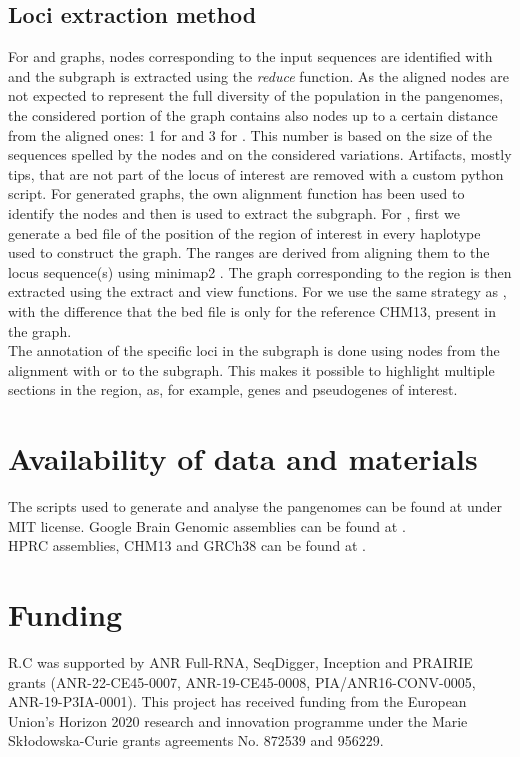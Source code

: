 \subsection*{\textbf{Loci extraction method}}
\label{app:extraction}
For \bifrost and \mdbg graphs, nodes corresponding to the input sequences are identified with \graphaligner\cite{graphaligner} and the subgraph is extracted using the \bandage \emph{reduce} function. As the aligned nodes are not expected to represent the full diversity of the population in the pangenomes, the considered portion of the graph contains also nodes up to a certain distance from the aligned ones: 1 for \mdbg and 3 for \bifrost. This number is based on the size of the sequences spelled by the nodes and on the considered variations. Artifacts, mostly tips, that are not part of the locus of interest are removed with a custom python script. For \minigraph generated graphs, the \minigraph own alignment function has been used to identify the nodes and then \bandage is used to extract the subgraph. For \pggb, first we generate a bed file of the position of the region of interest in every haplotype used to construct the graph. The ranges are derived from aligning them to the locus sequence(s) using minimap2 \cite{minimap2}. The graph corresponding to the region is then extracted using the \odgi extract and \odgi view functions. For \mcactus we use the same strategy as \pggb, with the difference that the bed file is only for the reference CHM13, present in the graph. \\
The annotation of the specific loci in the subgraph is done using nodes from the alignment with \minigraph or \graphaligner to the subgraph. This makes it possible to highlight multiple sections in the region, as, for example, genes and pseudogenes of interest. 

\section*{\textbf{Availability of data and materials}} %
The scripts used to generate and analyse the pangenomes can be found at \cite{source-code-github}\cite{source-code-zenodo} under MIT license.
Google Brain Genomic assemblies can be found at \cite{google-assemblies}. \\
HPRC assemblies, CHM13 and GRCh38 can be found at \cite{HPRC-haplotypes}.

\section*{\textbf{Funding}}
R.C was supported by ANR Full-RNA, SeqDigger, Inception and PRAIRIE grants (ANR-22-CE45-0007, ANR-19-CE45-0008, PIA/ANR16-CONV-0005, ANR-19-P3IA-0001). This project has received funding from the European Union’s Horizon 2020 research and innovation programme under the Marie Skłodowska-Curie grants agreements No. 872539 and 956229.

